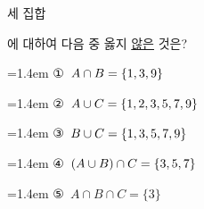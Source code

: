 세 집합\par\smallskip{}\par{}\par{}\par\smallskip\noindent 에 대하여 다음 중 옳지 \underline{않은} 것은?
\par\medskip\par\noindent\hangindent=1.4em {\small ①}\ $A\cap B=\{1{,}\mkern3mu\mathopen{}3{,}\mkern3mu\mathopen{}9\}$\par\noindent\hangindent=1.4em {\small ②}\ $A\cup C=\{1{,}\mkern3mu\mathopen{}2{,}\mkern3mu\mathopen{}3{,}\mkern3mu\mathopen{}5{,}\mkern3mu\mathopen{}7{,}\mkern3mu\mathopen{}9\}$\par\noindent\hangindent=1.4em {\small ③}\ $B\cup C=\{1{,}\mkern3mu\mathopen{}3{,}\mkern3mu\mathopen{}5{,}\mkern3mu\mathopen{}7{,}\mkern3mu\mathopen{}9\}$\par\noindent\hangindent=1.4em {\small ④}\ $(A\cup B)\cap C=\{3{,}\mkern3mu\mathopen{}5{,}\mkern3mu\mathopen{}7\}$\par\noindent\hangindent=1.4em {\small ⑤}\ $A\cap B\cap C=\{3\}$\par\medskip
